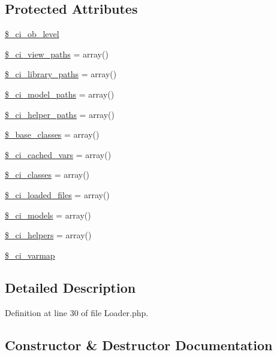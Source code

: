 \subsection*{Protected Attributes}
\begin{DoxyCompactItemize}
\item 
\hyperlink{class_c_i___loader_a499cf11349613b24142f9c13aa83ee1b}{\$\+\_\+ci\+\_\+ob\+\_\+level}
\item 
\hyperlink{class_c_i___loader_adc48c64c673b28c2447ea4214a27eeea}{\$\+\_\+ci\+\_\+view\+\_\+paths} = array()
\item 
\hyperlink{class_c_i___loader_a2cafeab35438db8fc21754e311b14e09}{\$\+\_\+ci\+\_\+library\+\_\+paths} = array()
\item 
\hyperlink{class_c_i___loader_ac5f53015a6bd6ce67af5e30cb156cce4}{\$\+\_\+ci\+\_\+model\+\_\+paths} = array()
\item 
\hyperlink{class_c_i___loader_a6ed0348d5a8afc689d71a234de8da95c}{\$\+\_\+ci\+\_\+helper\+\_\+paths} = array()
\item 
\hyperlink{class_c_i___loader_a3f6ad72a17d4acd515c8cc224b94297e}{\$\+\_\+base\+\_\+classes} = array()
\item 
\hyperlink{class_c_i___loader_a963cdc111da481606d2d67adf4c2947f}{\$\+\_\+ci\+\_\+cached\+\_\+vars} = array()
\item 
\hyperlink{class_c_i___loader_adad50876041bed7c7bf44aac03eb1162}{\$\+\_\+ci\+\_\+classes} = array()
\item 
\hyperlink{class_c_i___loader_a610f07342114240cecd9377d55f433f8}{\$\+\_\+ci\+\_\+loaded\+\_\+files} = array()
\item 
\hyperlink{class_c_i___loader_adf3c08ef6905b17b2237bfa89d556f2c}{\$\+\_\+ci\+\_\+models} = array()
\item 
\hyperlink{class_c_i___loader_abc8797a91f1cdb473e2d0ad65dcbff55}{\$\+\_\+ci\+\_\+helpers} = array()
\item 
\hyperlink{class_c_i___loader_a8dd33a8ab99688451b1f811f122d1114}{\$\+\_\+ci\+\_\+varmap}
\end{DoxyCompactItemize}


\subsection{Detailed Description}


Definition at line 30 of file Loader.\+php.



\subsection{Constructor \& Destructor Documentation}
